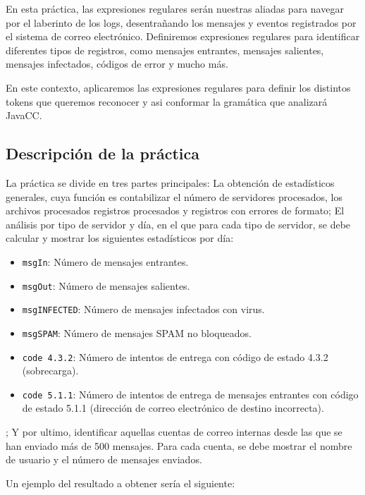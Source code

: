 En esta práctica, las expresiones regulares serán nuestras aliadas para navegar por el laberinto de los logs, desentrañando los mensajes y eventos registrados por el sistema de correo electrónico. Definiremos expresiones regulares para identificar diferentes tipos de registros, como mensajes entrantes, mensajes salientes, mensajes infectados, códigos de error y mucho más.

En este contexto, aplicaremos las expresiones regulares para definir los distintos tokens que queremos reconocer y asi conformar la gramática que analizará JavaCC.

\subsection{Descripción de la práctica}

\noindent La práctica se divide en tres partes principales: La obtención de estadísticos generales, cuya función es contabilizar el número de servidores procesados, los  archivos procesados registros procesados y registros con errores de formato; El análisis por tipo de servidor y día, en el que para cada tipo de servidor, se debe calcular y mostrar los siguientes estadísticos por día:

\begin{itemize}
    \item \lstinline|msgIn|: Número de mensajes entrantes.
    \item \lstinline|msgOut|: Número de mensajes salientes.
    \item \lstinline|msgINFECTED|: Número de mensajes infectados con virus.
    \item \lstinline|msgSPAM|: Número de mensajes SPAM no bloqueados.
    \item \lstinline|code 4.3.2|: Número de intentos de entrega con código de estado 4.3.2 (sobrecarga).
    \item \lstinline|code 5.1.1|: Número de intentos de entrega de mensajes  entrantes con código de estado 5.1.1 (dirección de correo electrónico de destino incorrecta).
\end{itemize}

; Y por ultimo, identificar aquellas cuentas de correo internas desde las que se han enviado más de 500 mensajes. Para cada cuenta, se debe mostrar el nombre de usuario y el número de mensajes enviados.

Un ejemplo del resultado a obtener sería el siguiente:

\lstset{inputencoding=utf8/latin1}


